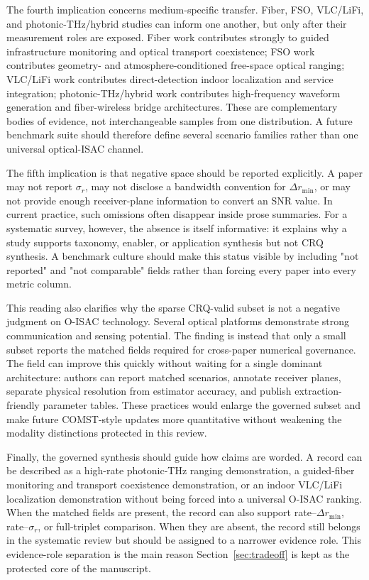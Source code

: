 \documentclass[letterpaper,journal]{IEEEtran}
\begin{document}
The fourth implication concerns medium-specific transfer. Fiber, FSO, VLC/LiFi, and photonic-THz/hybrid studies can inform one another, but only after their measurement roles are exposed. Fiber work contributes strongly to guided infrastructure monitoring and optical transport coexistence; FSO work contributes geometry- and atmosphere-conditioned free-space optical ranging; VLC/LiFi work contributes direct-detection indoor localization and service integration; photonic-THz/hybrid work contributes high-frequency waveform generation and fiber-wireless bridge architectures. These are complementary bodies of evidence, not interchangeable samples from one distribution. A future benchmark suite should therefore define several scenario families rather than one universal optical-ISAC channel.

The fifth implication is that negative space should be reported explicitly. A paper may not report $\sigma_r$, may not disclose a bandwidth convention for $\Delta r_{\min}$, or may not provide enough receiver-plane information to convert an SNR value. In current practice, such omissions often disappear inside prose summaries. For a systematic survey, however, the absence is itself informative: it explains why a study supports taxonomy, enabler, or application synthesis but not CRQ synthesis. A benchmark culture should make this status visible by including "not reported" and "not comparable" fields rather than forcing every paper into every metric column.

This reading also clarifies why the sparse CRQ-valid subset is not a negative judgment on O-ISAC technology. Several optical platforms demonstrate strong communication and sensing potential. The finding is instead that only a small subset reports the matched fields required for cross-paper numerical governance. The field can improve this quickly without waiting for a single dominant architecture: authors can report matched scenarios, annotate receiver planes, separate physical resolution from estimator accuracy, and publish extraction-friendly parameter tables. These practices would enlarge the governed subset and make future COMST-style updates more quantitative without weakening the modality distinctions protected in this review.

Finally, the governed synthesis should guide how claims are worded. A record can be described as a high-rate photonic-THz ranging demonstration, a guided-fiber monitoring and transport coexistence demonstration, or an indoor VLC/LiFi localization demonstration without being forced into a universal O-ISAC ranking. When the matched fields are present, the record can also support rate--$\Delta r_{\min}$, rate--$\sigma_r$, or full-triplet comparison. When they are absent, the record still belongs in the systematic review but should be assigned to a narrower evidence role. This evidence-role separation is the main reason Section~\ref{sec:tradeoff} is kept as the protected core of the manuscript.
\end{document}
